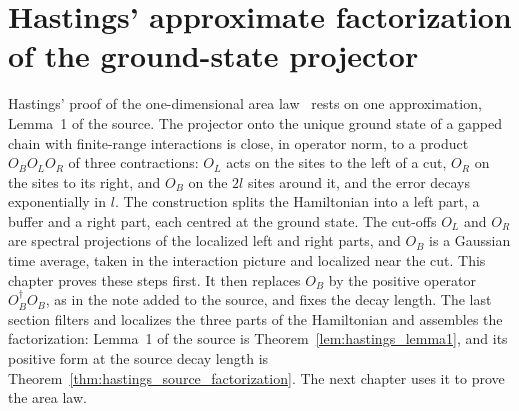 \chapter{Hastings' approximate factorization of the ground-state projector}
\label{ch:hastings_factorization}

Hastings' proof of the one-dimensional area law~\cite{Hastings2007AreaLaw}
rests on one approximation, Lemma~1 of the source. The projector onto the
unique ground state of a gapped chain with finite-range interactions is
close, in operator norm, to a product $O_BO_LO_R$ of three contractions:
$O_L$ acts on the sites to the left of a cut, $O_R$ on the sites to its
right, and $O_B$ on the $2l$ sites around it, and the error decays
exponentially in $l$. The construction splits the Hamiltonian into a left
part, a buffer and a right part, each centred at the ground state. The
cut-offs $O_L$ and $O_R$ are spectral projections of the localized left and
right parts, and $O_B$ is a Gaussian time average, taken in the interaction
picture and localized near the cut. This chapter proves these steps first.
It then replaces $O_B$ by the positive operator $O_B^\dagger O_B$, as in the
note added to the source, and fixes the decay length. The last section
filters and localizes the three parts of the Hamiltonian and assembles the
factorization: Lemma~1 of the source is
Theorem~\ref{lem:hastings_lemma1}, and its positive form at the source decay
length is Theorem~\ref{thm:hastings_source_factorization}. The
next chapter uses it to prove the area law.










